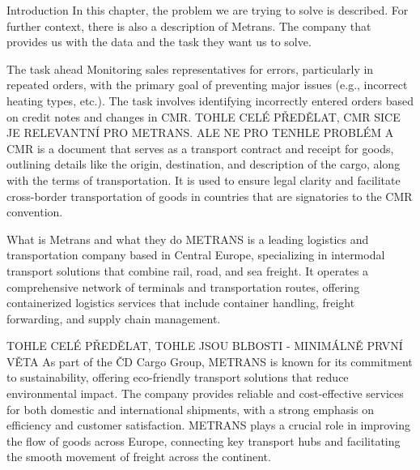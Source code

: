 \chap Introduction
In this chapter, the problem we are trying to solve is described. For further context, there is also a description of Metrans. The company that provides us with the data and the task they want us to solve. 

\sec The task ahead
Monitoring sales representatives for errors, particularly in repeated orders, with the primary goal of preventing major issues (e.g., incorrect heating types, etc.).
The task involves identifying incorrectly entered orders based on credit notes and changes in CMR.
TOHLE CELÉ PŘEDĚLAT, CMR SICE JE RELEVANTNÍ PRO METRANS. ALE NE PRO TENHLE PROBLÉM
A CMR is a document that serves as a transport contract and receipt for goods, outlining details like the origin, destination, and description of the cargo, along with the terms of transportation. It is used to ensure legal clarity and facilitate cross-border transportation of goods in countries that are signatories to the CMR convention.

\sec What is Metrans and what they do
METRANS is a leading logistics and transportation company based in Central Europe, specializing in intermodal transport solutions that combine rail, road, and sea freight. It operates a comprehensive network of terminals and transportation routes, offering containerized logistics services that include container handling, freight forwarding, and supply chain management.


TOHLE CELÉ PŘEDĚLAT, TOHLE JSOU BLBOSTI - MINIMÁLNĚ PRVNÍ VĚTA
As part of the ČD Cargo Group, METRANS is known for its commitment to sustainability, offering eco-friendly transport solutions that reduce environmental impact. The company provides reliable and cost-effective services for both domestic and international shipments, with a strong emphasis on efficiency and customer satisfaction. METRANS plays a crucial role in improving the flow of goods across Europe, connecting key transport hubs and facilitating the smooth movement of freight across the continent.
